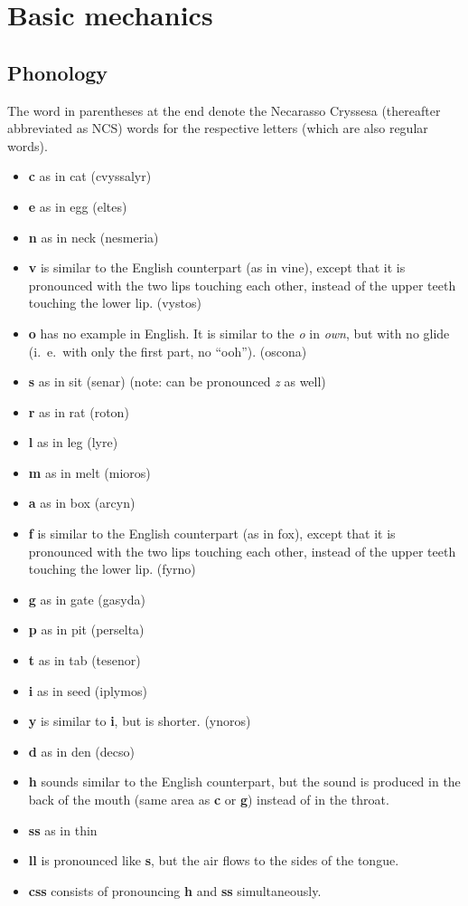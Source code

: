\chapter{Basic mechanics}

\newcommand{\shp}[3]{\item \textbf{#1} as in #2 (#3)}

\section{Phonology}

The word in parentheses at the end denote the Necarasso Cryssesa (thereafter abbreviated as NCS) words for the respective letters (which are also regular words).

\begin{itemize}
  \shp{c}{cat}{cvyssalyr}
  \shp{e}{egg}{eltes}
  \shp{n}{neck}{nesmeria}
  \item \textbf{v} is similar to the English counterpart (as in vine), except that it is pronounced with the two lips touching each other, instead of the upper teeth touching the lower lip. (vystos)
  \item \textbf{o} has no example in English. It is similar to the \emph{o} in \emph{own}, but with no glide (i.~e.~with only the first part, no ``ooh''). (oscona)
  \shp{s}{sit}{senar} (note: can be pronounced \emph{z} as well)
  \shp{r}{rat}{roton}
  \shp{l}{leg}{lyre}
  \shp{m}{melt}{mioros}
  \shp{a}{box}{arcyn}
  \item \textbf{f} is similar to the English counterpart (as in fox), except that it is pronounced with the two lips touching each other, instead of the upper teeth touching the lower lip. (fyrno)
  \shp{g}{gate}{gasyda}
  \shp{p}{pit}{perselta}
  \shp{t}{tab}{tesenor}
  \shp{i}{seed}{iplymos}
  \item \textbf{y} is similar to \textbf{i}, but is shorter. (ynoros)
  \shp{d}{den}{decso}
  \item \textbf{h} sounds similar to the English counterpart, but the sound is produced in the back of the mouth (same area as \textbf{c} or \textbf{g}) instead of in the throat.
  \item \textbf{ss} as in thin
  \item \textbf{ll} is pronounced like \textbf{s}, but the air flows to the sides of the tongue.
  \item \textbf{css} consists of pronouncing \textbf{h} and \textbf{ss} simultaneously.
\end{itemize}

